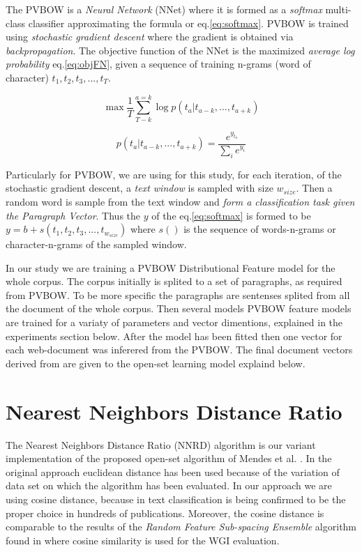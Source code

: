 \documentclass[runningheads]{llncs}
\begin{document}
The PVBOW is a \textit{Neural Network} (NNet) where it is formed as a \textit{softmax} multi-class classifier approximating the formula or eq.\ref{eq:softmax}. PVBOW is trained using \textit{stochastic gradient descent} where the gradient is obtained via \textit{backpropagation}. The objective function of the NNet is the maximized \textit{average log probability} eq.\ref{eq:objFN}, given a sequence of training n-grams (word of character) $t_{1}, t_{2}, t_{3}, ..., t_{T}$.

\begin{equation} \label{eq:objFN}
    \max{\frac{1}{T} \sum^{a=k}_{T-k}{\log{p(t_{a}|t_{a-k},...,t_{a+k})}}}
\end{equation}

\begin{equation} \label{eq:softmax}
    p(t_{a}|t_{a-k},...,t_{a+k}) = \frac{e^{y_{t_{a}}}}{\sum_{i}{e^{y_i}}}
\end{equation}

Particularly for PVBOW, we are using for this study, for each iteration, of the stochastic gradient descent, a \textit{text window} is sampled with size $w_{size}$. Then a random word is sample from the text window and \textit{form a classification task given the Paragraph Vector}. Thus the $y$ of the eq.\ref{eq:softmax} is formed to be $y = b + s(t_{1},t_{2},t_{3},...,t_{w_{size}})$ where $s()$ is the sequence of words-n-grams or character-n-grams of the sampled window.

In our study we are training a PVBOW Distributional Feature model for the whole corpus. The corpus initially is splited to a set of paragraphs, as required from PVBOW. To be more specific the paragraphs are sentenses splited from all the document of the whole corpus. Then several models PVBOW feature models are trained for a variaty of parameters and vector dimentions, explained in the experiments section below. After the model has been fitted then one vector for each web-document was inferered from the PVBOW. The final document vectors derived from  are given to the open-set learning model explaind below.

\section{Nearest Neighbors Distance Ratio}\label{sec:NNRD_Description}

The Nearest Neighbors Distance Ratio (NNRD) algorithm is our variant implementation of the proposed open-set algorithm of Mendes et al. \cite{mendesjunior2016}. In the original approach euclidean distance has been used because of the variation of data set on which the algorithm has been evaluated. In our approach we are using cosine distance, because in text classification is being confirmed to be the proper choice in hundreds of publications. Moreover, the cosine distance is comparable to the results of the \textit{Random Feature Sub-spacing Ensemble} algorithm found in \cite{pritsos2018open} where cosine similarity is used for the WGI evaluation.
\end{document}
